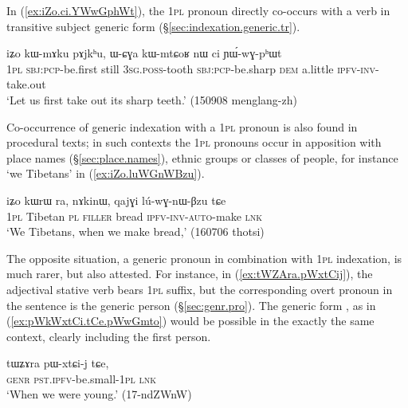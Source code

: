 In (\ref{ex:iZo.ci.YWwGphWt}), the \textsc{1pl} pronoun  directly co-occurs with a verb in transitive subject generic form (§\ref{sec:indexation.generic.tr}). 

\begin{exe}
\ex   \label{ex:iZo.ci.YWwGphWt}
 \gll  iʑo kɯ-mɤku pɤjkʰu, ɯ-ɕɣa kɯ-mtɕoʁ nɯ ci ɲɯ́-wɣ-pʰɯt \\
 \textsc{1pl} \textsc{sbj}:\textsc{pcp}-be.first still \textsc{3sg}.\textsc{poss}-tooth \textsc{sbj}:\textsc{pcp}-be.sharp \textsc{dem} a.little \textsc{ipfv}-\textsc{inv}-take.out \\
\glt `Let us first take out its sharp teeth.' (150908 menglang-zh)
\end{exe}

Co-occurrence of generic indexation with a \textsc{1pl} pronoun is also found in procedural texts; in such contexts the  \textsc{1pl} pronouns occur in apposition with place names (§\ref{sec:place.names}), ethnic groups or classes of people, for instance  `we Tibetans' in (\ref{ex:iZo.luWGnWBzu}).

\begin{exe}
\ex   \label{ex:iZo.luWGnWBzu}
 \gll iʑo kɯrɯ ra, nɤkinɯ, qajɣi lú-wɣ-nɯ-βzu tɕe \\
\textsc{1pl} Tibetan \textsc{pl} \textsc{filler} bread \textsc{ipfv}-\textsc{inv}-\textsc{auto}-make \textsc{lnk} \\
\glt `We Tibetans, when we make bread,' (160706 thotsi)
\end{exe}

The opposite situation, a generic pronoun in combination with \textsc{1pl} indexation, is much rarer, but also attested. For instance, in (\ref{ex:tWZAra.pWxtCij}), the adjectival stative verb  bears \textsc{1pl}  suffix, but the corresponding overt pronoun in the sentence is the generic person  (§\ref{sec:genr.pro}). The generic form , as in (\ref{ex:pWkWxtCi.tCe.pWwGmto}) would be possible in the exactly the same context, clearly including the first person.

\begin{exe}
\ex   \label{ex:tWZAra.pWxtCij}
 \gll tɯʑɤra pɯ-xtɕi-j tɕe, \\
 \textsc{genr} \textsc{pst}.\textsc{ipfv}-be.small-\textsc{1pl} \textsc{lnk} \\
 \glt `When we were young.' (17-ndZWnW) 
\end{exe}

